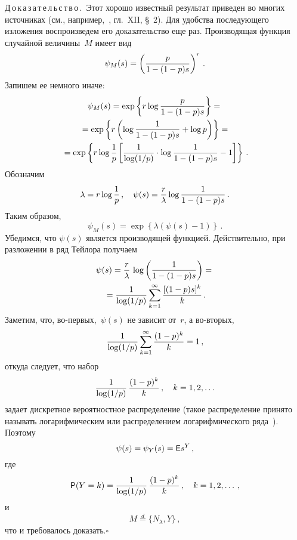 \begin{multicols}{2}
\noindent
Д\,о\,к\,а\,з\,а\,т\,е\,л\,ь\,с\,т\,в\,о\,.\ Этот хорошо известный результат приведен во многих
источниках (см., например,~\cite{3g}, гл.~XII, \S~2). Для удобства
по\-сле\-ду\-юще\-го изложения воспроизведем его доказательство еще раз.
Производящая функция случайной величины~$M$ имеет вид
$$
\psi_{M}(s)=\left(\displaystyle\frac{\displaystyle p\mathstrut}{\displaystyle 1-(1-p)s\mathstrut}\right)^r\,.
$$
Запишем ее немного иначе:
\begin{multline*}
\psi_{M}(s)=\exp\left\{r\log\frac{p}{1-(1-p)s}\right\}={}\\
{}=\exp\left\{r\left(\log\displaystyle\frac{\displaystyle 1\mathstrut}{\displaystyle 1-(1-p)s\mathstrut}+\log
p\right)\right\}={}\\
{}=\exp\left\{r
\log\displaystyle\frac{\displaystyle 1\mathstrut}{\displaystyle p\mathstrut}\left[\displaystyle\frac{\displaystyle 1\mathstrut}{\displaystyle \log ({1/}{p})\mathstrut}\cdot\log\displaystyle\frac{\displaystyle 1\mathstrut}{\displaystyle 1-(1-p)s\mathstrut}-1\right]\right\}\,.
\end{multline*}
Обозначим
\begin{equation} 
\lambda= r \log\fr{1}{p}\,,
\quad
\psi(s)=\fr{r}{\lambda}\log\fr{1}{1-(1-p)s}\,.
\label{Tuu03}
\end{equation}
Таким образом,
$$
\psi_{M}(s)=\exp\left\{\lambda(\psi(s)-1)\right\}\,.
$$
Убедимся, что $\psi(s)$ является производящей функцией.
Действительно, при разложении в ряд Тейлора получаем
\begin{multline*}
\psi(s)=\displaystyle\frac{\displaystyle r\mathstrut}{\displaystyle \lambda\mathstrut}\,\log\left(\displaystyle\frac{\displaystyle 1\mathstrut}{\displaystyle 1-(1-p)s\mathstrut}\right)={}\\
{}=
\displaystyle\frac{\displaystyle 1\mathstrut}{\displaystyle \log(1/p)\mathstrut}\sum\limits_{k=1}^\infty
\displaystyle\frac{\displaystyle [(1-p)s]^k\mathstrut}{\displaystyle k\mathstrut}\,.
\end{multline*}
Заметим, что, во-первых,~$\psi(s)$ не зависит от~$r$, а во-вторых,
$$
\displaystyle\frac{\displaystyle 1\mathstrut}{\displaystyle \log(1/p)\mathstrut}\sum\limits_{k=1}^\infty\frac{(1-p)^k}{k}=1\,,
$$
откуда следует, что набор
$$
\displaystyle\frac{\displaystyle 1\mathstrut}{\displaystyle \log(1/p)\mathstrut}\,\displaystyle\frac{\displaystyle (1-p)^k\mathstrut}{\displaystyle k\mathstrut}\,, \quad
k=1,2,\ldots
$$
задает дискретное вероятностное распределение (такое распределение
принято называть логарифмическим или распределением
логарифмического ряда~\cite{11g, 12g}). Поэтому
\begin{equation} 
\psi(s)=\psi_{Y}(s)=\e s^Y\,,
\label{Tu104}
\end{equation}
где
\begin{equation*}
{\sf P}(Y=k)=\displaystyle\frac{\displaystyle 1\mathstrut}{\displaystyle \log({1}/{p})\mathstrut}\,\displaystyle\frac{\displaystyle (1-p)^k\mathstrut}{\displaystyle k\mathstrut}\,, \quad k=1,2,\ldots \,,
\end{equation*}
и
$$
M \stackrel{d}{=} \{N_{\lambda},Y\}\,,
$$
что и требовалось доказать.\hfill$\square$

\medskip


\end{multicols}
